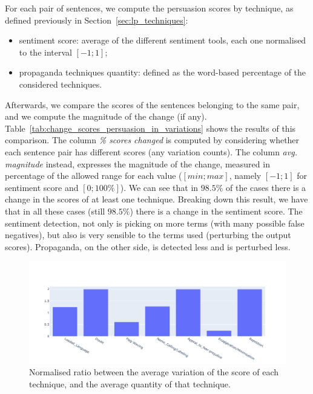 For each pair of sentences, we compute the persuasion scores by technique, as defined previously in Section~\ref{sec:lp_techniques}:
\begin{itemize}
    \item sentiment score: average of the different sentiment tools, each one normalised to the interval $[-1;1]$;
    \item propaganda techniques quantity: defined as the word-based percentage of the considered techniques.
\end{itemize}
Afterwards, we compare the scores of the sentences belonging to the same pair, and we compute the magnitude of the change (if any).
Table~\ref{tab:change_scores_persuasion_in_variations} shows the results of this comparison.
The column \textit{\% scores changed} is computed by considering whether each sentence pair has different scores (any variation counts). The column \textit{avg. magnitude} instead, expresses the magnitude of the change, measured in percentage of the allowed range for each value ($[min;max]$, namely $[-1;1]$ for sentiment score and $[0;100\%]$).
We can see that in $98.5\%$ of the cases there is a change in the scores of at least one technique.
Breaking down this result, we have that in all these cases (still $98.5\%$) there is a change in the sentiment score. The sentiment detection, not only is picking on more terms (with many possible false negatives), but also is very sensible to the terms used (perturbing the output scores).
Propaganda, on the other side, is detected less and is perturbed less.

\begin{figure}[!htbp]
    \centering
    \includegraphics[width=\linewidth]{figures/4.3.1_normalised_ratio_scores.pdf}
    \caption{Normalised ratio between the average variation of the score of each technique, and the average quantity of that technique.}
    \label{fig:normalised_ratio_scores_persuasion}
\end{figure}

